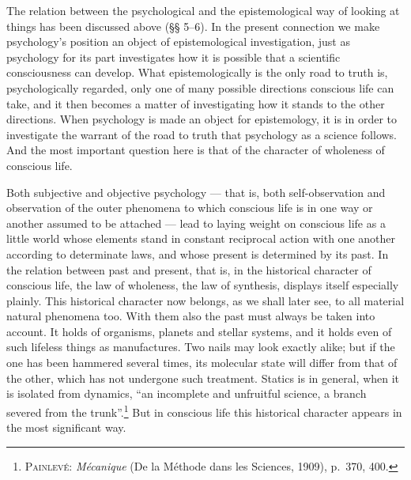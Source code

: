 \documentclass[12pt]{book}
\newcommand{\opage}[1]{\marginnote{\footnotesize\textit{[#1]}}}
\begin{document}
The relation between the psychological and the epistemological way of looking at
things has been discussed above (§§ 5--6). In the present connection we make
psychology's position an object of epistemological investigation, just as psychology
for its part investigates how it is possible that a scientific consciousness can
develop. What epistemologically is the only road to truth is, psychologically
regarded, only one of many possible directions conscious life can take, and \opage{57}it then
becomes a matter of investigating how it stands to the other directions. When
psychology is made an object for epistemology, it is in order to investigate the
warrant of the road to truth that psychology as a science follows. And the most
important question here is that of the character of wholeness of conscious life.

Both subjective and objective psychology --- that is, both self-observation and
observation of the outer phenomena to which conscious life is in one way or another
assumed to be attached --- lead to laying weight on conscious life as a little world
whose elements stand in constant reciprocal action with one another according to
determinate laws, and whose present is determined by its past. In the relation between
past and present, that is, in the historical character of conscious life, the law of
wholeness, the law of synthesis, displays itself especially plainly. This historical
character now belongs, as we shall later see, to all material natural phenomena too.
With them also the past must always be taken into account. It holds of organisms,
planets and stellar systems, and it holds even of such lifeless things as
manufactures. Two nails may look exactly alike; but if the one has been hammered
several times, its molecular state will differ from that of the other, which has not
undergone such treatment. Statics is in general, when it is isolated from dynamics,
``an incomplete and unfruitful science, a branch severed from the
trunk''.\footnote{\textsc{Painlevé}: \textit{Mécanique} (De la Méthode dans les
Sciences, 1909), p.\ 370, 400.} But in conscious
life this historical character appears in the most significant way.
\end{document}
